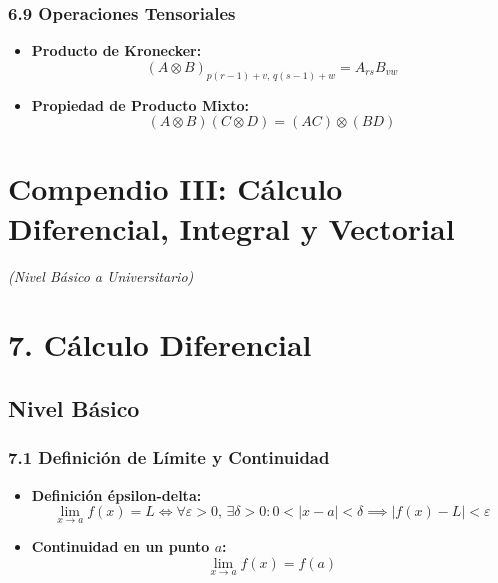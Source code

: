 \documentclass[11pt,a4paper]{article}
\begin{document}
\subsubsection*{6.9 Operaciones Tensoriales}

\begin{itemize}
  \item \textbf{Producto de Kronecker:}
  \[
    (A \otimes B)_{p(r-1)+v, \, q(s-1)+w} = A_{rs} B_{vw}
  \]
  \item \textbf{Propiedad de Producto Mixto:}
  \[
    (A \otimes B)(C \otimes D) = (AC) \otimes (BD)
  \]
\end{itemize}

\section*{Compendio III: Cálculo Diferencial, Integral y Vectorial}

\textit{(Nivel Básico a Universitario)}

\section*{7. Cálculo Diferencial}

\subsection*{Nivel Básico}

\subsubsection*{7.1 Definición de Límite y Continuidad}

\begin{itemize}
  \item \textbf{Definición épsilon-delta:}
  \[
    \lim_{x \to a} f(x) = L \iff \forall \varepsilon > 0, \, \exists \delta > 0 : 0 < |x - a| < \delta \implies |f(x) - L| < \varepsilon
  \]
  \item \textbf{Continuidad en un punto $a$:}
  \[
    \lim_{x \to a} f(x) = f(a)
  \]
\end{itemize}
\end{document}
